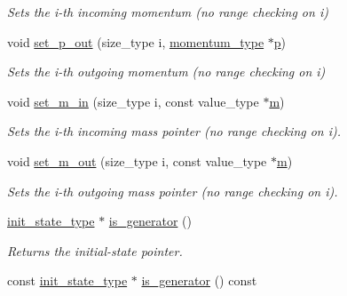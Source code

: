 \begin{DoxyCompactItemize}
\begin{DoxyCompactList}\small\item\em Sets the i-\/th incoming momentum (no range checking on i) \end{DoxyCompactList}\item 
\hypertarget{a00450_a492347db4ed4e67d34bd0f06f3f0b516}{}void \hyperlink{a00450_a492347db4ed4e67d34bd0f06f3f0b516}{set\+\_\+p\+\_\+out} (size\+\_\+type i, \hyperlink{a00579}{momentum\+\_\+type} $\ast$\hyperlink{a00450_ac25aaa44a2bde95d582aac52f85fdfdf}{p})\label{a00450_a492347db4ed4e67d34bd0f06f3f0b516}

\begin{DoxyCompactList}\small\item\em Sets the i-\/th outgoing momentum (no range checking on i) \end{DoxyCompactList}\item 
\hypertarget{a00450_ab780bbfe111a895c3ce8d39838b0f937}{}void \hyperlink{a00450_ab780bbfe111a895c3ce8d39838b0f937}{set\+\_\+m\+\_\+in} (size\+\_\+type i, const value\+\_\+type $\ast$\hyperlink{a00451_a3a9390d5b0f36b7778161963c43843b0}{m})\label{a00450_ab780bbfe111a895c3ce8d39838b0f937}

\begin{DoxyCompactList}\small\item\em Sets the i-\/th incoming mass pointer (no range checking on i). \end{DoxyCompactList}\item 
\hypertarget{a00450_ae04f7eebaa9e1423f234ee12aeef49bd}{}void \hyperlink{a00450_ae04f7eebaa9e1423f234ee12aeef49bd}{set\+\_\+m\+\_\+out} (size\+\_\+type i, const value\+\_\+type $\ast$\hyperlink{a00451_a3a9390d5b0f36b7778161963c43843b0}{m})\label{a00450_ae04f7eebaa9e1423f234ee12aeef49bd}

\begin{DoxyCompactList}\small\item\em Sets the i-\/th outgoing mass pointer (no range checking on i). \end{DoxyCompactList}\item 
\hypertarget{a00450_a9ebd7d8439b1d13de3ce75d5d926258f}{}\hyperlink{a00308}{init\+\_\+state\+\_\+type} $\ast$ \hyperlink{a00450_a9ebd7d8439b1d13de3ce75d5d926258f}{is\+\_\+generator} ()\label{a00450_a9ebd7d8439b1d13de3ce75d5d926258f}

\begin{DoxyCompactList}\small\item\em Returns the initial-\/state pointer. \end{DoxyCompactList}\item 
\hypertarget{a00450_a85bcfbe92a10b142cbb5bb45c4b55714}{}const \hyperlink{a00308}{init\+\_\+state\+\_\+type} $\ast$ \hyperlink{a00450_a85bcfbe92a10b142cbb5bb45c4b55714}{is\+\_\+generator} () const \label{a00450_a85bcfbe92a10b142cbb5bb45c4b55714}


\end{DoxyCompactItemize}
